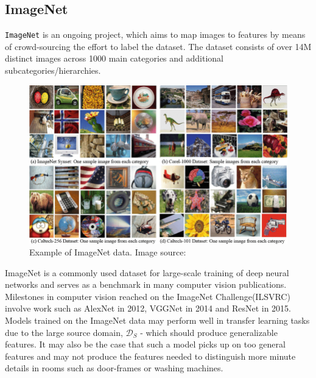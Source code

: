 \subsection{ImageNet}
\texttt{ImageNet}\autocite{imagenet_cvpr09} is an ongoing project, which aims to map images to features by means of crowd-sourcing the effort to label the dataset. 
The dataset consists of over 14M distinct images across 1000 main categories and additional subcategories/hierarchies. 
\begin{figure}[H]
    \centering
    \includegraphics[scale=0.3]{pictures/random/imagenet}
    \caption{Example of ImageNet data. Image source: \autocite{imagenetex}}
    \label{fig:imagenetdata}
\end{figure}

\newline
ImageNet is a commonly used dataset for large-scale training of deep neural networks and serves as a benchmark in many computer vision publications.
Milestones in computer vision reached on the ImageNet Challenge(ILSVRC) involve work such as AlexNet in 2012, VGGNet\autocite{NIPS2012_4824} in 2014 and ResNet\autocite{ResNet2015} in 2015. 
\newline
Models trained on the ImageNet data may perform well in transfer learning tasks due to the large source domain, $\mathcal{D}_{S}$ - which should produce generalizable features. 
It may also be the case that such a model picks up on too general features and may not produce the features needed to distinguish more minute details in rooms such as door-frames or washing machines.
